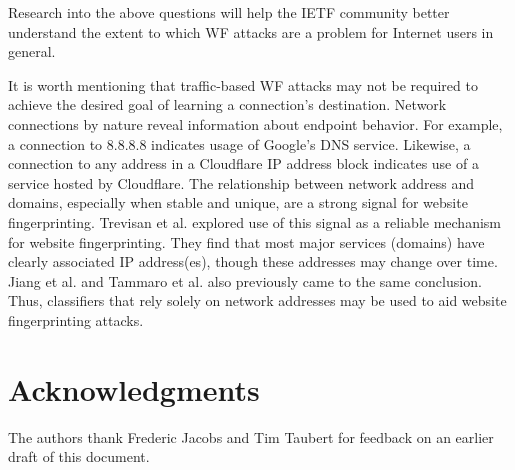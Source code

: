 \documentclass[runningheads]{llncs}
\begin{document}
Research into the above questions will help the IETF community better understand the extent to which
WF attacks are a problem for Internet users in general.

It is worth mentioning that traffic-based WF attacks may not be required to achieve the desired
goal of learning a connection's destination. Network connections by nature reveal information
about endpoint behavior. For example, a connection to 8.8.8.8 indicates usage of Google's
DNS service. Likewise, a connection to any address in a Cloudflare IP address block indicates
use of a service hosted by Cloudflare. The relationship between network address
and domains, especially when stable and unique, are a strong signal for website
fingerprinting. Trevisan et al. \cite{trevisan2016towards} explored use of this
signal as a reliable mechanism for website fingerprinting. They find that
most major services (domains) have clearly associated IP address(es), though
these addresses may change over time. Jiang et al. \cite{jiang2007lightweight}
and Tammaro et al. \cite{tammaro2012exploiting} also previously came to the same
conclusion. Thus, classifiers that rely solely on network addresses may be used to
aid website fingerprinting attacks.

\section{Acknowledgments}
The authors thank Frederic Jacobs and Tim Taubert for feedback on an earlier draft of this document.



\end{document}
